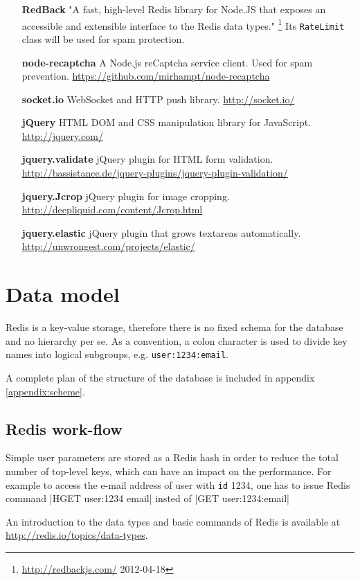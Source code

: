 \documentclass[12pt,oneside]{fithesis}
\begin{document}
\begin{itemize}
			\item[\textbf{RedBack}] "A fast, high-level Redis library for Node.JS that exposes an accessible and extensible interface to the Redis data types." \footnote{\url{http://redbackjs.com/} 2012-04-18} Its \texttt{RateLimit} class will be used for spam protection. 
			\item[\textbf{node-recaptcha}] A Node.js reCaptcha service client. Used for spam prevention. \url{https://github.com/mirhampt/node-recaptcha}
			\item[\textbf{socket.io}] WebSocket and HTTP push library. \url{http://socket.io/}
			\item[\textbf{jQuery}] HTML DOM and CSS manipulation library for JavaScript. \url{http://jquery.com/}
			\item[\textbf{jquery.validate}] jQuery plugin for HTML form validation. \url{http://bassistance.de/jquery-plugins/jquery-plugin-validation/}
			\item[\textbf{jquery.Jcrop}] jQuery plugin for image cropping. \url{http://deepliquid.com/content/Jcrop.html}
			\item[\textbf{jquery.elastic}] jQuery plugin that grows textareas automatically. \url{http://unwrongest.com/projects/elastic/}
			
			
		\end{itemize}
\section{Data model}
	Redis is a key-value storage, therefore there is no fixed schema for the database and no hierarchy per se.  As a convention, a colon character is used to divide key names into logical subgroups, e.g. \texttt{user:1234:email}. 
	
	A complete plan of the structure of the database is included in appendix \ref{appendix:scheme}.
	\subsection{Redis work-flow}
	Simple user parameters are stored as a Redis hash in order to reduce the total number of top-level keys, which can have an impact on the performance. For example to access the e-mail address of user with \texttt{id} 1234, one has to issue Redis command |HGET user:1234 email| insted of |GET user:1234:email|
	
	
	An introduction to the data types and basic commands of Redis is available at \url{http://redis.io/topics/data-types}.
	
\end{document}

